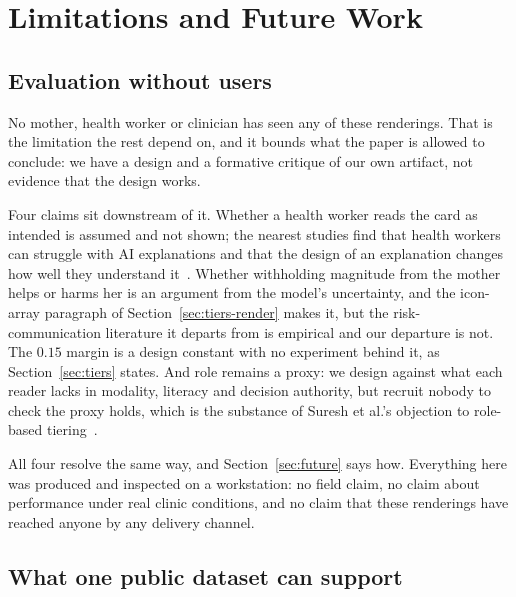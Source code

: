 \section{Limitations and Future Work}
\label{sec:limitations}

\subsection{Evaluation without users}

No mother, health worker or clinician has seen any of these renderings. That
is the limitation the rest depend on, and it bounds what the paper is allowed
to conclude: we have a design and a formative critique of our own artifact,
not evidence that the design works.

Four claims sit downstream of it. Whether a health worker reads the card as
intended is assumed and not shown; the nearest studies find that health
workers can struggle with AI explanations and that the design of an
explanation changes how well they understand
it~\citep{okolo2024easy,solanokamaiko2024explorable}. Whether
withholding magnitude from the mother helps or harms her is an argument from
the model's uncertainty, and the icon-array paragraph of
Section~\ref{sec:tiers-render} makes it, but the
risk-communication literature it departs from is empirical and our departure
is not. The $0.15$ margin is a design constant with no experiment behind it,
as Section~\ref{sec:tiers} states. And role remains a proxy: we design
against what each reader lacks in modality, literacy and decision authority,
but recruit nobody to check the proxy holds, which is the substance of Suresh
et al.'s objection to role-based tiering~\citep{suresh2021beyond}.

All four resolve the same way, and Section~\ref{sec:future} says how.
Everything here was produced and inspected on a workstation: no field claim,
no claim about performance under real clinic conditions, and no claim that
these renderings have reached anyone by any delivery channel.

\subsection{What one public dataset can support}
\label{sec:lim-data}

